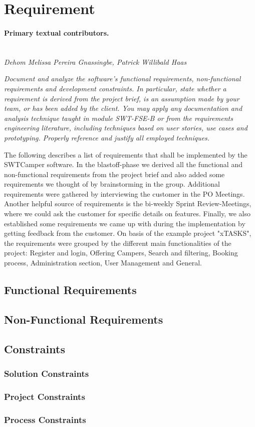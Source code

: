 \section{Requirement}
\label{sec:requirements}

\paragraph{Primary textual contributors.}
\mbox{}\\\emph{Dehom Melissa Pereira Gnassingbe, Patrick Willibald Haas}

\emph{Document and analyze the software's functional requirements, 
non-functional requirements and development constraints. In particular, state 
whether a requirement is derived from the project brief, is an assumption made 
by your team, or has been added by the client. You may apply any documentation 
and analysis technique taught in module SWT-FSE-B or from the requirements 
engineering literature, including techniques based on user stories, use cases 
and prototyping. Properly reference and justify all employed techniques.}


The following describes a list of requirements that shall be implemented by the SWTCamper software.
In the blastoff-phase we derived all the functional and non-functional requirements from the project brief and also added some requirements we thought of by brainstorming in the group.
Additional requirements were gathered by interviewing the customer in the PO Meetings.
Another helpful source of requirements is the bi-weekly Sprint Review-Meetings, where we could ask the customer for specific details on features.
Finally, we also established some requirements we came up with during the implementation by getting feedback from the customer.
On basis of the example project "xTASKS", the requirements were grouped by the different main functionalities of the project: Register and login, Offering Campers, Search and filtering, Booking process, Administration section, User Management and General.

\subsection{Functional Requirements}
\subsection{Non-Functional Requirements}
\subsection{Constraints}
\subsubsection{Solution Constraints}
\subsubsection{Project Constraints}
\subsubsection{Process Constraints}